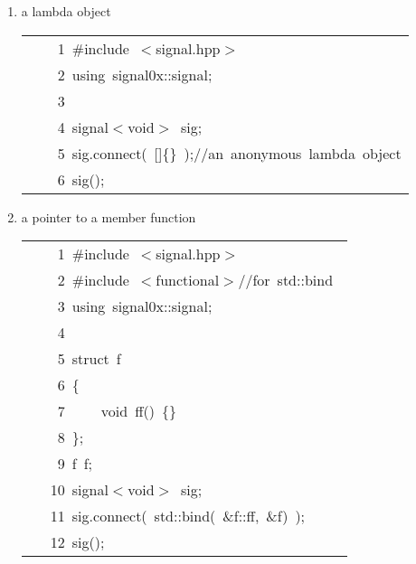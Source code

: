 \documentclass[9pt,onside,a4paper]{article}
\newcommand{\hlstd}[1]{\textcolor[rgb]{0.2,0,0.4}{#1}}
\newcommand{\hlslc}[1]{\textcolor[rgb]{0,0.4,0.2}{#1}}
\newcommand{\hlppc}[1]{\textcolor[rgb]{0.33,0.45,0.69}{#1}}
\newcommand{\hlopt}[1]{\textcolor[rgb]{0.33,0.33,0.33}{#1}}
\newcommand{\hllin}[1]{\textcolor[rgb]{0.6,0.6,0.6}{#1}}
\newcommand{\hlkwa}[1]{\textcolor[rgb]{1,0.19,0.19}{#1}}
\newcommand{\hlkwb}[1]{\textcolor[rgb]{0.96,0.55,0.14}{#1}}
\newcommand{\hlkwd}[1]{\textcolor[rgb]{0.82,0.11,0.93}{#1}}
\begin{document}
\begin{enumerate}
\item a lambda object \\

\ttfamily
\begin{center}
\begin{xtabular}{||l||}
\hline
\hlstd{}\hllin{\ \ \ \ 1\ }\hlppc{\#include\ $<$signal.hpp$>$}\\
\hllin{\ \ \ \ 2\ }\hlstd{}\hlkwa{using\ }\hlstd{signal0x}\hlopt{::}\hlstd{signal}\hlopt{;}\\
\hllin{\ \ \ \ 3\ }\hlstd{}\\
\hllin{\ \ \ \ 4\ }\hlstd{signal}\hlopt{$<$}\hlstd{}\hlkwb{void}\hlstd{}\hlopt{$>$\ }\hlstd{sig}\hlopt{;}\\
\hllin{\ \ \ \ 5\ }\hlstd{sig}\hlopt{.}\hlstd{}\hlkwd{connect}\hlstd{}\hlopt{(\ {[}{]}\{\}\ );}\hlstd{}\hlslc{//an\ anonymous\ lambda\ object}\\
\hllin{\ \ \ \ 6\ }\hlstd{}\hlkwd{sig}\hlstd{}\hlopt{();}\hlstd{}\\
\hline
\end{xtabular}
\end{center}
\normalfont
\normalsize




\item a pointer to a member function \\

\ttfamily
\begin{center}
\begin{xtabular}{||l||}
\hline
\hlstd{}\hllin{\ \ \ \ 1\ }\hlppc{\#include\ $<$signal.hpp$>$}\\
\hllin{\ \ \ \ 2\ }\hlstd{}\hlppc{\#include\ $<$functional$>$}\hlslc{//for\ std::bind\ }\\
\hllin{\ \ \ \ 3\ }\hlppc{}\hlstd{}\hlkwa{using\ }\hlstd{signal0x}\hlopt{::}\hlstd{signal}\hlopt{;}\\
\hllin{\ \ \ \ 4\ }\hlstd{}\\
\hllin{\ \ \ \ 5\ }\hlkwb{struct\ }\hlstd{f}\\
\hllin{\ \ \ \ 6\ }\hlopt{\{}\\
\hllin{\ \ \ \ 7\ }\hlstd{}\hlstd{\ \ \ \ }\hlstd{}\hlkwb{void\ }\hlstd{}\hlkwd{ff}\hlstd{}\hlopt{()\ \{\}}\\
\hllin{\ \ \ \ 8\ }\hlstd{}\hlopt{\};}\\
\hllin{\ \ \ \ 9\ }\hlstd{f\ f\textunderscore }\hlopt{;}\\
\hllin{\ \ \ 10\ }\hlstd{signal}\hlopt{$<$}\hlstd{}\hlkwb{void}\hlstd{}\hlopt{$>$\ }\hlstd{sig}\hlopt{;}\\
\hllin{\ \ \ 11\ }\hlstd{sig}\hlopt{.}\hlstd{}\hlkwd{connect}\hlstd{}\hlopt{(\ }\hlstd{std}\hlopt{::}\hlstd{}\hlkwd{bind}\hlstd{}\hlopt{(\ \&}\hlstd{f}\hlopt{::}\hlstd{ff}\hlopt{,\ \&}\hlstd{f\textunderscore }\hlopt{)\ );}\\
\hllin{\ \ \ 12\ }\hlstd{}\hlkwd{sig}\hlstd{}\hlopt{();}\hlstd{}\\
\hline
\end{xtabular}
\end{center}
\normalfont
\normalsize

\end{enumerate}
\end{document}
